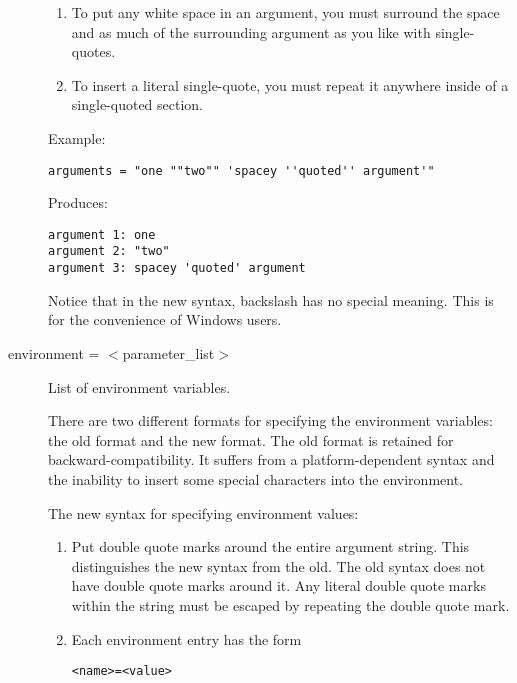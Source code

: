 \begin{description}
\begin{enumerate}
\item To put any white space in an argument, you must surround the
space and as much of the surrounding argument as you like with
single-quotes.

\item To insert a literal single-quote, you must repeat it anywhere
inside of a single-quoted section.

\end{enumerate}

Example:

\begin{verbatim}
arguments = "one ""two"" 'spacey ''quoted'' argument'"
\end{verbatim}

Produces:

\begin{verbatim}
argument 1: one
argument 2: "two"
argument 3: spacey 'quoted' argument
\end{verbatim}

Notice that in the new syntax, backslash has no special meaning.  This
is for the convenience of Windows users.


\item[environment = $<$parameter\_list$>$] List of environment
\label{man-condor-submit-environment}
variables.

There are two different formats for specifying the environment
variables: the old format and the new format.  The old format is
retained for backward-compatibility.  It suffers from a
platform-dependent syntax and the inability to insert some special
characters into the environment.

The new syntax for specifying environment values:

\begin{enumerate}

\item Put double quote marks around the entire argument string.  This
distinguishes the new syntax from the old.
The old syntax does not have double quote marks around it.
Any literal double quote marks within the string
must be escaped by repeating the double quote mark.

\item Each environment entry has the form

\begin{verbatim}
<name>=<value>
\end{verbatim}


\end{enumerate}
\end{description}
